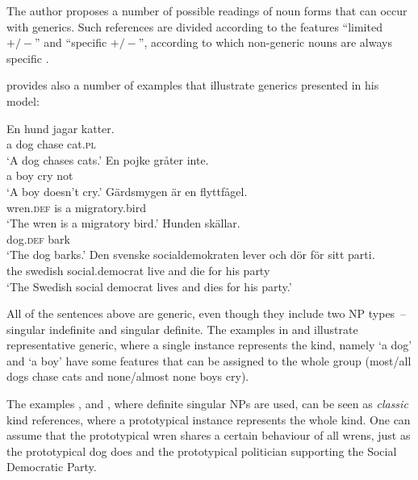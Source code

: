 \documentclass[output=paper]{langsci/langscibook}
\begin{document}
The author proposes a number of possible readings of noun forms that can occur with generics. Such references are divided according to the features ``limited $+/-$'' and ``specific $+/-$'', according to which non-generic nouns are always specific \citep[121]{Pettersson1976}.

\citeauthor{Pettersson1976} provides also a number of examples that illustrate generics presented in his model:

\ea\label{ex:swedish1}
	\gll En hund jagar katter. \\
		 a dog chase cat.\textsc{pl} \\
	\glt `A dog chases cats.'
\ex\label{ex:swedish2}
	\gll En pojke gråter inte. \\
		 a boy cry not \\
	\glt `A boy doesn't cry.'
\ex\label{ex:swedish3}
	\gll Gärdsmygen är en flyttfågel.\\
		 wren.\textsc{def} is a migratory.bird \\
	\glt `The wren is a migratory bird.'
\ex\label{ex:swedish4}
	\gll Hunden skällar. \\
		 dog.\textsc{def} bark \\
	\glt `The dog barks.'
\ex\label{ex:swedish5}
	\gll Den svenske socialdemokraten lever och dör för sitt parti. \\
		 the swedish social.democrat live and die for his party \\
	\glt `The Swedish social democrat lives and dies for his party.'
\z
	
\noindent All of the sentences above are generic, even though they include two NP types~-- singular indefinite and singular definite. The examples in  and  illustrate representative generic, where a single instance represents the kind, namely `a dog' and `a boy' have some features that can be assigned to the whole group (most/all dogs chase cats and none/almost none boys cry).

\begin{sloppypar}
The examples ,  and , where definite singular NPs are used, can be seen as \textit{classic} kind references, where a prototypical instance represents the whole kind. One can assume that the prototypical wren shares a certain behaviour of all wrens, just as the prototypical dog does and the prototypical politician supporting the Social Democratic Party.
\end{sloppypar}
\end{document}
